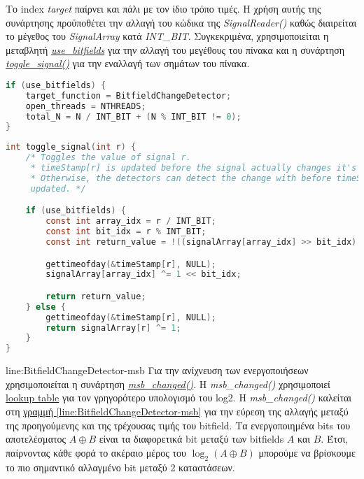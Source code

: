 Το index \textit{target} παίρνει και πάλι με τον ίδιο τρόπο τιμές.
Η χρήση αυτής της συνάρτησης προϋποθέτει την αλλαγή του κώδικα της 
\textit{SignalReader()} 
καθώς διαιρείται το μέγεθος του \textit{SignalArray} κατά \textit{INT\_BIT}. 
Συγκεκριμένα, χρησιμοποιείται η μεταβλητή 
\hyperref[lst:total_N]{\textit{use\_bitfields}} για την αλλαγή του μεγέθους του 
πίνακα και η συνάρτηση \hyperref[lst:togle_signal]{\textit{toggle\_signal()}} 
για την εναλλαγή των σημάτων του πίνακα.
\begin{lstlisting}[language=c, caption={Αλλαγή μεγέθους του SignalArray}, 
escapechar=$, label={lst:total_N}]
if (use_bitfields) {
    target_function = BitfieldChangeDetector;
    open_threads = NTHREADS;
    total_N = N / INT_BIT + (N % INT_BIT != 0);
}
\end{lstlisting}
\begin{lstlisting}[language=c, caption={toggle\_signal()}, 
escapechar=$, label={lst:togle_signal}]
int toggle_signal(int r) {
    /* Toggles the value of signal r.
     * timeStamp[r] is updated before the signal actually changes it's value.
     * Otherwise, the detectors can detect the change with before timeStamp is 
     updated. */

    if (use_bitfields) {
        const int array_idx = r / INT_BIT;
        const int bit_idx = r % INT_BIT;
        const int return_value = !((signalArray[array_idx] >> bit_idx) & 1);

        gettimeofday(&timeStamp[r], NULL);
        signalArray[array_idx] ^= 1 << bit_idx;

        return return_value;
    } else {
        gettimeofday(&timeStamp[r], NULL);
        return signalArray[r] ^= 1;
    }
}
\end{lstlisting}
line:BitfieldChangeDetector-msb
Για την ανίχνευση των ενεργοποιήσεων χρησιμοποιείται η συνάρτηση 
\hyperref[lst:msb_changed]{\textit{msb\_changed()}}. H \textit{msb\_changed()} 
χρησιμοποιεί 
\href{https://graphics.stanford.edu/~seander/bithacks.html#IntegerLogLookup}{lookup
 table} για τον γρηγορότερο υπολογισμό του log2. H \textit{msb\_changed()} 
 καλείται στη
 \hyperref[line:BitfieldChangeDetector-msb]{γραμμή 
 \ref*{line:BitfieldChangeDetector-msb}} για την εύρεση της αλλαγής μεταξύ της 
 προηγούμενης και της τρέχουσας τιμής του bitfield.
 Τα ενεργοποιημένα bits του αποτελέσματος $A \oplus B$ είναι τα διαφορετικά bit 
 μεταξύ των bitfields $A$ και $B$.
 Έτσι, παίρνοντας κάθε φορά το ακέραιο μέρος του $\log_2 \left( A \oplus B 
 \right)$ 
 μπορούμε να βρίσκουμε το πιο σημαντικό αλλαγμένο bit μεταξύ 2 καταστάσεων.
